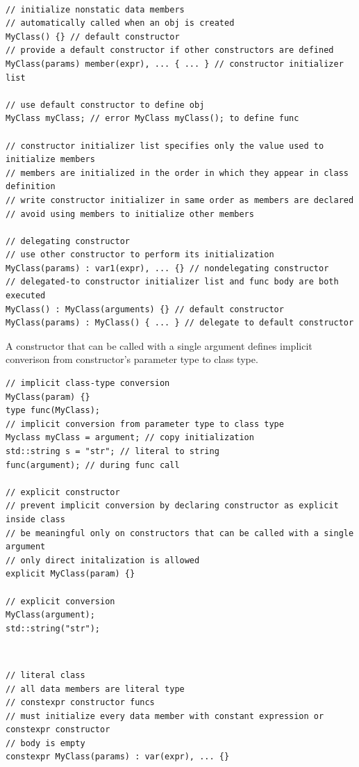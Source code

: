\documentclass{blog}
\begin{document}
\begin{definition}~
    \begin{verbatim}
// initialize nonstatic data members
// automatically called when an obj is created
MyClass() {} // default constructor
// provide a default constructor if other constructors are defined
MyClass(params) member(expr), ... { ... } // constructor initializer list

// use default constructor to define obj
MyClass myClass; // error MyClass myClass(); to define func

// constructor initializer list specifies only the value used to initialize members
// members are initialized in the order in which they appear in class definition
// write constructor initializer in same order as members are declared
// avoid using members to initialize other members

// delegating constructor
// use other constructor to perform its initialization
MyClass(params) : var1(expr), ... {} // nondelegating constructor
// delegated-to constructor initializer list and func body are both executed
MyClass() : MyClass(arguments) {} // default constructor
MyClass(params) : MyClass() { ... } // delegate to default constructor
\end{verbatim}
\end{definition}

\begin{definition}
    A constructor that can be called with a single argument defines implicit converison from
    constructor's parameter type to class type.
    \begin{verbatim}
// implicit class-type conversion
MyClass(param) {}
type func(MyClass);
// implicit conversion from parameter type to class type
Myclass myClass = argument; // copy initialization
std::string s = "str"; // literal to string
func(argument); // during func call

// explicit constructor
// prevent implicit conversion by declaring constructor as explicit inside class
// be meaningful only on constructors that can be called with a single argument
// only direct initalization is allowed
explicit MyClass(param) {}

// explicit conversion
MyClass(argument);
std::string("str");
\end{verbatim}
\end{definition}

\begin{definition}~
    \begin{verbatim}
// literal class
// all data members are literal type
// constexpr constructor funcs
// must initialize every data member with constant expression or constexpr constructor
// body is empty
constexpr MyClass(params) : var(expr), ... {}
\end{verbatim}
\end{definition}
\end{document}
